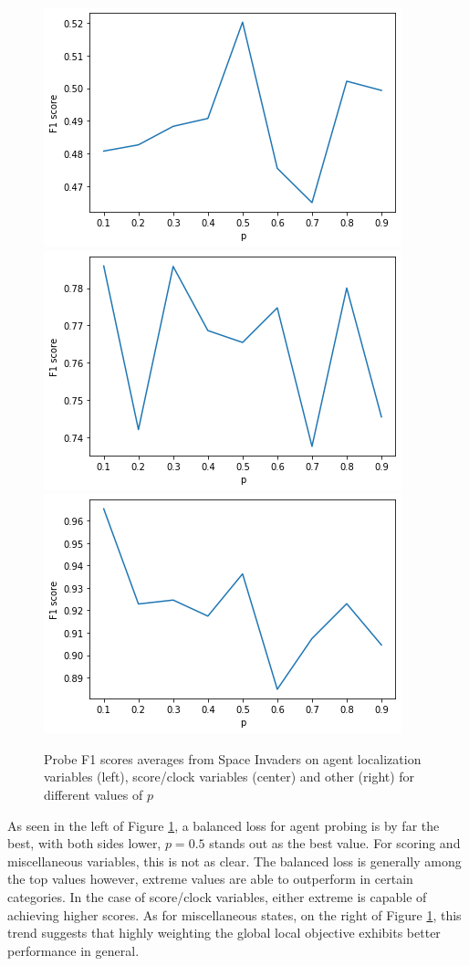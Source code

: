 \documentclass{article}
\begin{document}
\begin{figure}[H]
    \centering
    \includegraphics[scale=0.38]{ablation2-agent_avg_f1.png}
    \includegraphics[scale=0.38]{ablation2-score_avg_f1.png}
    \includegraphics[scale=0.38]{ablation2-other_avg_f1.png}
    \caption{Probe F1 scores averages from Space Invaders on agent localization variables (left), score/clock variables (center) and other (right) for different values of $p$}
    \label{fig:ablation2-avg}
\end{figure}

As seen in the left of Figure \ref{fig:ablation2-avg}, a balanced loss for agent probing is by far the best, with both sides lower, $p=0.5$ stands out as the best value. For scoring and miscellaneous variables, this is not as clear. The balanced loss is generally among the top values however, extreme values are able to outperform in certain categories. In the case of score/clock variables, either extreme is capable of achieving higher scores. As for miscellaneous states, on the right of Figure \ref{fig:ablation2-avg}, this trend suggests that highly weighting the global local objective exhibits better performance in general. \\
\end{document}

